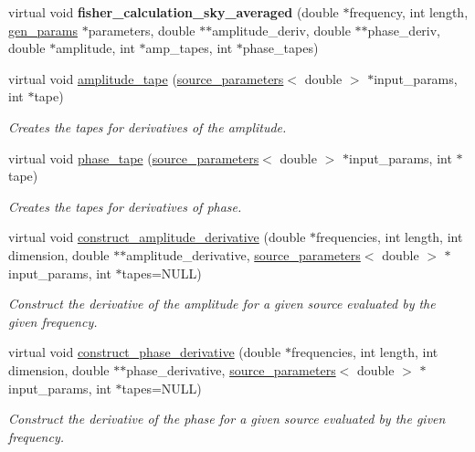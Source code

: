 \begin{DoxyCompactItemize}
virtual void {\bfseries fisher\+\_\+calculation\+\_\+sky\+\_\+averaged} (double $\ast$frequency, int length, \hyperlink{classgen__params}{gen\+\_\+params} $\ast$parameters, double $\ast$$\ast$amplitude\+\_\+deriv, double $\ast$$\ast$phase\+\_\+deriv, double $\ast$amplitude, int $\ast$amp\+\_\+tapes, int $\ast$phase\+\_\+tapes)
\item 
virtual void \hyperlink{classppE__IMRPhenomD__IMR_a3119a07c11ed53ae94823b11c5234c4f}{amplitude\+\_\+tape} (\hyperlink{structsource__parameters}{source\+\_\+parameters}$<$ double $>$ $\ast$input\+\_\+params, int $\ast$tape)
\begin{DoxyCompactList}\small\item\em Creates the tapes for derivatives of the amplitude. \end{DoxyCompactList}\item 
virtual void \hyperlink{classppE__IMRPhenomD__IMR_acf2ed8617b3e24ecc273a409ff579ce4}{phase\+\_\+tape} (\hyperlink{structsource__parameters}{source\+\_\+parameters}$<$ double $>$ $\ast$input\+\_\+params, int $\ast$tape)
\begin{DoxyCompactList}\small\item\em Creates the tapes for derivatives of phase. \end{DoxyCompactList}\item 
virtual void \hyperlink{classppE__IMRPhenomD__IMR_a5b80e5ae4dd83da49beb15e6e5f17715}{construct\+\_\+amplitude\+\_\+derivative} (double $\ast$frequencies, int length, int dimension, double $\ast$$\ast$amplitude\+\_\+derivative, \hyperlink{structsource__parameters}{source\+\_\+parameters}$<$ double $>$ $\ast$input\+\_\+params, int $\ast$tapes=N\+U\+LL)
\begin{DoxyCompactList}\small\item\em Construct the derivative of the amplitude for a given source evaluated by the given frequency. \end{DoxyCompactList}\item 
virtual void \hyperlink{classppE__IMRPhenomD__IMR_a78151d1f34693b69cf6ccbc28df4caa6}{construct\+\_\+phase\+\_\+derivative} (double $\ast$frequencies, int length, int dimension, double $\ast$$\ast$phase\+\_\+derivative, \hyperlink{structsource__parameters}{source\+\_\+parameters}$<$ double $>$ $\ast$input\+\_\+params, int $\ast$tapes=N\+U\+LL)
\begin{DoxyCompactList}\small\item\em Construct the derivative of the phase for a given source evaluated by the given frequency. \end{DoxyCompactList}\end{DoxyCompactItemize}



